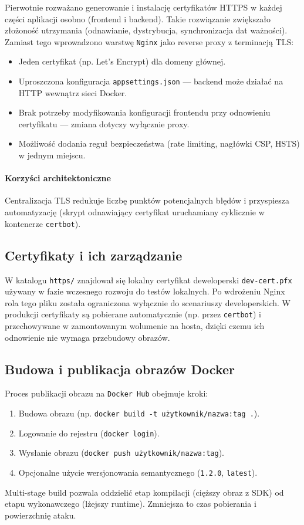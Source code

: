 Pierwotnie rozważano generowanie i instalację certyfikatów HTTPS w każdej części aplikacji osobno (frontend i backend). Takie rozwiązanie zwiększało złożoność utrzymania (odnawianie, dystrybucja, synchronizacja dat ważności). Zamiast tego wprowadzono warstwę \texttt{Nginx} jako reverse proxy z terminacją TLS:
\begin{itemize}
    \item Jeden certyfikat (np. Let's Encrypt) dla domeny głównej.
    \item Uproszczona konfiguracja \texttt{appsettings.json} — backend może działać na HTTP wewnątrz sieci Docker.
    \item Brak potrzeby modyfikowania konfiguracji frontendu przy odnowieniu certyfikatu — zmiana dotyczy wyłącznie proxy.
    \item Możliwość dodania reguł bezpieczeństwa (rate limiting, nagłówki CSP, HSTS) w jednym miejscu.
\end{itemize}

\paragraph{Korzyści architektoniczne} Centralizacja TLS redukuje liczbę punktów potencjalnych błędów i przyspiesza automatyzację (skrypt odnawiający certyfikat uruchamiany cyklicznie w kontenerze \texttt{certbot}).

\pagebreak

\subsection{Certyfikaty i ich zarządzanie}

W katalogu \texttt{https/} znajdował się lokalny certyfikat deweloperski \texttt{dev-cert.pfx} używany w fazie wczesnego rozwoju do testów lokalnych. Po wdrożeniu Nginx rola tego pliku została ograniczona wyłącznie do scenariuszy developerskich. W produkcji certyfikaty są pobierane automatycznie (np. przez \texttt{certbot}) i przechowywane w zamontowanym wolumenie na hosta, dzięki czemu ich odnowienie nie wymaga przebudowy obrazów.

\subsection{Budowa i publikacja obrazów Docker}

\noindent
Proces publikacji obrazu na \texttt{Docker Hub} obejmuje kroki:
\begin{enumerate}
    \item Budowa obrazu (np. \texttt{docker build -t użytkownik/nazwa:tag .}).
    \item Logowanie do rejestru (\texttt{docker login}).
    \item Wysłanie obrazu (\texttt{docker push użytkownik/nazwa:tag}).
    \item Opcjonalne użycie wersjonowania semantycznego (\texttt{1.2.0}, \texttt{latest}).
\end{enumerate}
\bigskip
Multi-stage build pozwala oddzielić etap kompilacji (cięższy obraz z SDK) od etapu wykonawczego (lżejszy runtime). Zmniejsza to czas pobierania i powierzchnię ataku.

